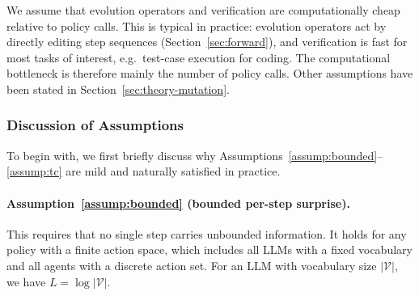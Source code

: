 

We assume that evolution operators and verification are computationally cheap relative to policy calls. This is typical in practice: evolution operators act by directly editing step sequences (Section~\ref{sec:forward}), and verification is fast for most tasks of interest, e.g.\ test-case execution for coding. The computational bottleneck is therefore mainly the number of policy calls. Other assumptions have been stated in Section~\ref{sec:theory-mutation}.

\subsubsection{Discussion of Assumptions}
\label{app:assumptions}

To begin with, we first briefly discuss why Assumptions~\ref{assump:bounded}--\ref{assump:tc} are mild and naturally satisfied in practice.

\paragraph{Assumption~\ref{assump:bounded} (bounded per-step surprise).} This requires that no single step carries unbounded information. It holds for any policy with a finite action space, which includes all LLMs with a fixed vocabulary and all agents with a discrete action set. For an LLM with vocabulary size $|\mathcal{V}|$, we have $L = \log |\mathcal{V}|$.

